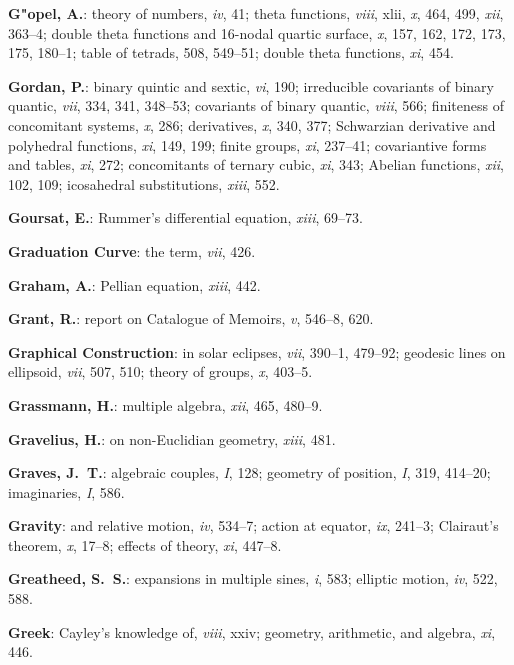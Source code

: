 \documentclass[11pt,a4paper]{article}
\newcommand{\IndexEntry}[1]{\textbf{#1}}
\newcommand{\V}[1]{\textit{#1}} %
\begin{document}
\IndexEntry{G"opel, A.}: theory of numbers, \V{iv}, 41; theta functions, \V{viii}, xlii, \V{x}, 464, 499, \V{xii}, 363--4; double theta functions and 16-nodal quartic surface, \V{x}, 157, 162, 172, 173, 175, 180--1; table of tetrads, 508, 549--51; double theta functions, \V{xi}, 454.

\IndexEntry{Gordan, P.}: binary quintic and sextic, \V{vi}, 190; irreducible covariants of binary quantic, \V{vii}, 334, 341, 348--53; covariants of binary quantic, \V{viii}, 566; finiteness of concomitant systems, \V{x}, 286; derivatives, \V{x}, 340, 377; Schwarzian derivative and polyhedral functions, \V{xi}, 149, 199; finite groups, \V{xi}, 237--41; covariantive forms and tables, \V{xi}, 272; concomitants of ternary cubic, \V{xi}, 343; Abelian functions, \V{xii}, 102, 109; icosahedral substitutions, \V{xiii}, 552.

\newpage

\setcounter{page}{101}

\IndexEntry{Goursat, E.}: Rummer's differential equation, \V{xiii}, 69--73.

\IndexEntry{Graduation Curve}: the term, \V{vii}, 426.

\IndexEntry{Graham, A.}: Pellian equation, \V{xiii}, 442.

\IndexEntry{Grant, R.}: report on Catalogue of Memoirs, \V{v}, 546--8, 620.

\IndexEntry{Graphical Construction}: in solar eclipses, \V{vii}, 390--1, 479--92; geodesic lines on ellipsoid, \V{vii}, 507, 510; theory of groups, \V{x}, 403--5.

\IndexEntry{Grassmann, H.}: multiple algebra, \V{xii}, 465, 480--9.

\IndexEntry{Gravelius, H.}: on non-Euclidian geometry, \V{xiii}, 481.

\IndexEntry{Graves, J.\ T.}: algebraic couples, \V{I}, 128; geometry of position, \V{I}, 319, 414--20; imaginaries, \V{I}, 586.

\IndexEntry{Gravity}: and relative motion, \V{iv}, 534--7; action at equator, \V{ix}, 241--3; Clairaut's theorem, \V{x}, 17--8; effects of theory, \V{xi}, 447--8.

\IndexEntry{Greatheed, S.\ S.}: expansions in multiple sines, \V{i}, 583; elliptic motion, \V{iv}, 522, 588.

\IndexEntry{Greek}: Cayley's knowledge of, \V{viii}, xxiv; geometry, arithmetic, and algebra, \V{xi}, 446.
\end{document}
